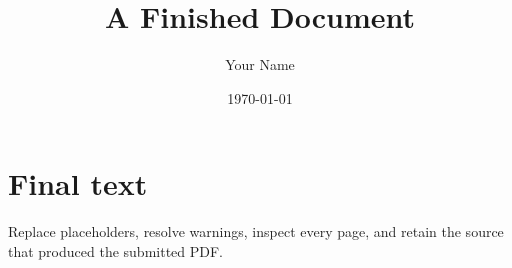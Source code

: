 \documentclass{article}
\title{A Finished Document}
\author{Your Name}
\date{\today}
\begin{document}
\maketitle

\section{Final text}
Replace placeholders, resolve warnings, inspect every page, and retain the
source that produced the submitted PDF.
\end{document}
